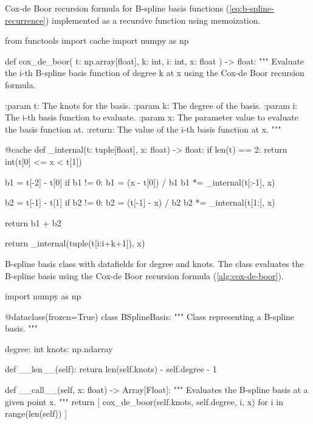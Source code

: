 \begin{algorithm}
    \caption{Cox-de Boor recursion formula for B-spline basis functions (\cref{eq:b-spline-recurrence}) implemented as a recursive function using memoization.}
    \label{alg:cox-de-boor}
    \begin{python}
    from functools import cache
    import numpy as np
    
    def cox_de_boor(
        t: np.array[float], k: int, i: int, x: float
    ) -> float:
        """
        Evaluate the i-th B-spline basis function of degree k at x
        using the Cox-de Boor recursion formula.
    
        :param t: The knots for the basis.
        :param k: The degree of the basis.
        :param i: The i-th basis function to evaluate.
        :param x: The parameter value to evaluate the basis function at.
        :return: The value of the i-th basis function at x.
        """
    
        @cache
        def _internal(t: tuple[float], x: float) -> float:
            if len(t) == 2:
                return int(t[0] <= x < t[1])
    
            b1 = t[-2] - t[0]
            if b1 != 0:
                b1 = (x - t[0]) / b1
                b1 *= _internal(t[:-1], x)
    
            b2 = t[-1] - t[1]
            if b2 != 0:
                b2 = (t[-1] - x) / b2
                b2 *= _internal(t[1:], x)
    
            return b1 + b2
    
        return _internal(tuple(t[i:i+k+1]), x)    
    
    \end{python}
    \end{algorithm}




\begin{algorithm}
\caption{B-spline basis class with datafields for degree and knots. The class evaluates the B-spline basis using the Cox-de Boor recursion formula (\cref{alg:cox-de-boor}).}
\label{alg:b-spline-class}
\begin{python}
import numpy as np

@dataclass(frozen=True)
class BSplineBasis:
    """
    Class representing a B-spline basis.
    """

    degree: int
    knots: np.ndarray

    def __len__(self):
        return len(self.knots) - self.degree - 1

    def __call__(self, x: float) -> Array[Float]:
        """
        Evaluates the B-spline basis at a given point x.
        """
        return [
            cox_de_boor(self.knots, self.degree, i, x)
            for i in range(len(self))
        ]

\end{python}
\end{algorithm}

